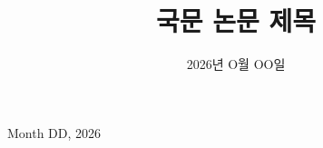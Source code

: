 
\title[English Title of This Thesis]{국문 논문 제목}






\date{2026년 O월 OO일}{Month DD, 2026}



\def\mykeywords{keyword1, keyword2, keyword3}
\def\mykeywordsko{주요어1, 주요어2, 주요어3}

